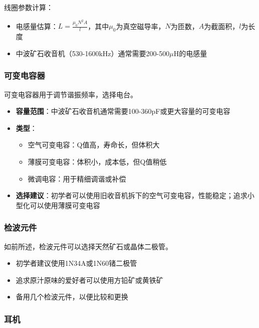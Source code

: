 \documentclass[12pt,UTF8]{ctexbook}
\begin{document}
线圈参数计算：
\begin{itemize}[leftmargin=3.5em]
    \item 电感量估算：$L = \frac{\mu_0 N^2 A}{l}$，其中$\mu_0$为真空磁导率，$N$为匝数，$A$为截面积，$l$为长度
    \item 中波矿石收音机（530-1600kHz）通常需要200-500$\mu$H的电感量
\end{itemize}

\subsubsection{可变电容器}

可变电容器用于调节谐振频率，选择电台。

\begin{itemize}[leftmargin=3.5em]
    \item \textbf{容量范围}：中波矿石收音机通常需要100-360pF或更大容量的可变电容
    \item \textbf{类型}：
        \begin{itemize}[leftmargin=3.5em]
            \item 空气可变电容：Q值高，寿命长，但体积大
            \item 薄膜可变电容：体积小，成本低，但Q值稍低
            \item 微调电容：用于精细调谐或补偿
        \end{itemize}
    \item \textbf{选择建议}：初学者可以使用旧收音机拆下的空气可变电容，性能稳定；追求小型化可以使用薄膜可变电容
\end{itemize}

\subsubsection{检波元件}

如前所述，检波元件可以选择天然矿石或晶体二极管。

\begin{itemize}[leftmargin=3.5em]
    \item 初学者建议使用1N34A或1N60锗二极管
    \item 追求原汁原味的爱好者可以使用方铅矿或黄铁矿
    \item 备用几个检波元件，以便比较和更换
\end{itemize}

\subsubsection{耳机}
\end{document}
